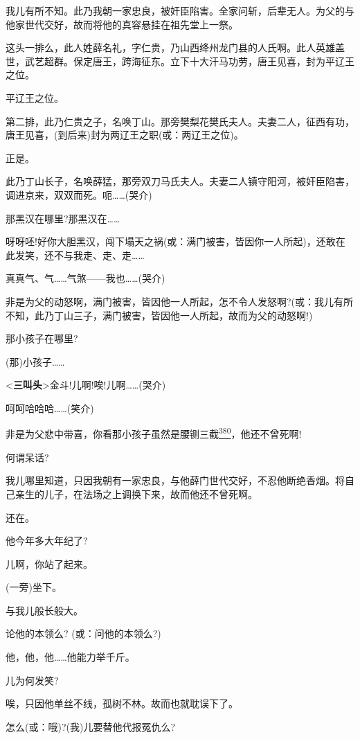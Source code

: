 我儿有所不知。此乃我朝一家忠良，被奸臣陷害。全家问斩，后辈无人。为父的与他家世代交好，故而将他的真容悬挂在祖先堂上一祭。

这头一排么，此人姓薛名礼，字仁贵，乃山西绛州龙门县的人氏啊。此人英雄盖世，武艺超群。保定唐王，跨海征东。立下十大汗马功劳，唐王见喜，封为平辽王之位。

平辽王之位。

第二排，此乃仁贵之子，名唤丁山。那旁樊梨花樊氏夫人。夫妻二人，征西有功，唐王见喜，(到后来)封为两辽王之职(或：两辽王之位)。

正是。

此乃丁山长子，名唤薛猛，那旁双刀马氏夫人。夫妻二人镇守阳河，被奸臣陷害，调进京来，双双而死。呃\ldots{}\ldots{}(哭介)

那黑汉在哪里?那黑汉在\ldots{}\ldots{}

呀呀呸!好你大胆黑汉，闯下塌天之祸(或：满门被害，皆因你一人所起)，还敢在此发笑，还不与我走、走、走\ldots{}\ldots{}

真真气、气\ldots{}\ldots{}气煞------我也\ldots{}\ldots{}(哭介)

非是为父的动怒啊，满门被害，皆因他一人所起，怎不令人发怒啊?(或：我儿有所不知，此乃丁山三子，满门被害，皆因他一人所起，故而为父的动怒啊!)

那小孩子在哪里?

(那)小孩子\ldots{}\ldots{}

\textless{}\textbf{三叫头}\textgreater{}金斗!儿啊!唉!儿啊\ldots{}\ldots{}(哭介)

呵呵哈哈哈\ldots{}\ldots{}(笑介)

非是为父悲中带喜，你看那小孩子虽然是腰铡三截\protect\hyperlink{fn380}{\textsuperscript{380}}，他还不曾死啊!

何谓呆话?

我儿哪里知道，只因我朝有一家忠良，与他薛门世代交好，不忍他断绝香烟。将自己亲生的儿子，在法场之上调换下来，故而他还不曾死啊。

还在。

他今年多大年纪了?

儿啊，你站了起来。

(一旁)坐下。

与我儿般长般大。

论他的本领么? (或：问他的本领么?)

他，他，他\ldots{}\ldots{}他能力举千斤。

儿为何发笑?

唉，只因他单丝不线，孤树不林。故而也就耽误下了。

怎么(或：哦)?(我)儿要替他代报冤仇么?

